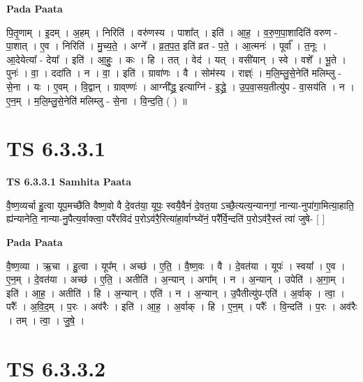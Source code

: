 \documentclass[17pt]{extarticle}
\begin{document}
\textbf{Pada Paata} \newline

पि॒तृ॒णाम् । इ॒दम् । अ॒हम् । निरिति॑ । वरु॑णस्य । पाशा᳚त् । इति॑ । आ॒ह॒ । व॒रु॒ण॒पा॒शादिति॑ वरुण - पा॒शात् । ए॒व । निरिति॑ । मु॒च्य॒ते॒ । अग्ने᳚ । व्र॒त॒प॒त॒ इति॑ व्रत - प॒ते॒ । आ॒त्मनः॑ । पूर्वा᳚ । त॒नूः । आ॒देयेत्या᳚ - देया᳚ । इति॑ । आ॒हुः॒ । कः । हि । तत् । वेद॑ । यत् । वसी॑यान् । स्वे । वशे᳚ । भू॒ते । पुनः॑ । वा॒ । ददा॑ति । न । वा॒ । इति॑ । ग्रावा॑णः । वै । सोम॑स्य । राज्ञ्ः॑ । म॒लि॒म्लु॒से॒नेति॑ मलिम्लु - से॒ना । यः । ए॒वम् । वि॒द्वान् । ग्राव्‌ण्णः॑  । आग्नी᳚द्ध्र॒ इत्याग्नि॑ - इ॒द्ध्रे॒ । उ॒प॒वा॒सय॒तीत्यु॑प - वा॒सय॑ति । न । ए॒न॒म् । म॒लि॒म्लु॒से॒नेति॑ मलिम्लु - से॒ना । वि॒न्द॒ति॒ ( ) ॥  \newline




\section*{ TS 6.3.3.1 }

\textbf{TS 6.3.3.1 } \newline
\textbf{Samhita Paata} \newline

वै॒ष्ण॒व्यर्चा हु॒त्वा यूप॒मच्छै॑ति वैष्ण॒वो वै दे॒वत॑या॒ यूपः॒ स्वयै॒वैनं॑ दे॒वत॒या ऽच्छै॒त्यत्य॒न्यानगां॒ नान्या-नुपा॑गा॒मित्या॒हाति॒ ह्य॑न्यानेति॒ नान्या-नु॒पैत्य॒र्वाक्त्वा॒ परै॑रविदं प॒रोऽव॑रै॒रित्या॑हा॒र्वाग्घ्ये॑नं॒ परै᳚र्वि॒न्दति॑ प॒रोऽव॑रै॒स्तं त्वा॑ जुषे- [  ] \newline

\textbf{Pada Paata} \newline

वै॒ष्ण॒व्या । ऋ॒चा । हु॒त्वा । यूप᳚म् । अच्छ॑ । ए॒ति॒ । वै॒ष्ण॒वः । वै । दे॒वत॑या । यूपः॑ । स्वया᳚ । ए॒व । ए॒न॒म् । दे॒वत॑या । अच्छ॑ । ए॒ति॒ । अतीति॑ । अ॒न्यान् । अगा᳚म् । न । अ॒न्यान् । उपेति॑ । अ॒गा॒म् । इति॑ । आ॒ह॒ । अतीति॑ । हि । अ॒न्यान् । एति॑ । न । अ॒न्यान् । उ॒पैतीत्यु॑प-एति॑ । अ॒र्वाक् । त्वा॒ । परैः᳚ । अ॒वि॒द॒म् । प॒रः । अव॑रैः । इति॑ । आ॒ह॒ । अ॒र्वाक् । हि । ए॒न॒म् । परैः᳚ । वि॒न्दति॑ । प॒रः । अव॑रैः । तम् । त्वा॒ । जु॒षे॒ ।  \newline




\section*{ TS 6.3.3.2 }
\end{document}
